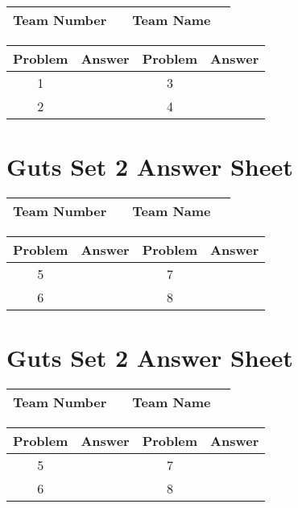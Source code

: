 \documentclass[14pt]{article}
\begin{document}
\begin{center}
\begin{tabular}{|r|r|r|r|}
\hline
	Team Number & \hspace{10em} &
	Team Name & \hspace{15em} \\ \hline
\end{tabular}
\end{center}
\begin{tabularx}{\textwidth}{|c|l|c|X|}\hline
	Problem & Answer & Problem & Answer \\\hline
	1 & \hspace{15em} & 3 & \\\hline
	2 & & 4 & \\\hline
\end{tabularx}

\section*{Guts Set 2 Answer Sheet}

\begin{center}
\begin{tabular}{|r|r|r|r|}
\hline
	Team Number & \hspace{10em} &
	Team Name & \hspace{15em} \\ \hline
\end{tabular}
\end{center}
\begin{tabularx}{\textwidth}{|c|l|c|X|}\hline
	Problem & Answer & Problem & Answer \\\hline
	5 & \hspace{15em} & 7 & \\\hline
	6 & & 8 & \\\hline
\end{tabularx}

\vspace{30px}

\section*{Guts Set 2 Answer Sheet}

\begin{center}
\begin{tabular}{|r|r|r|r|}
\hline
	Team Number & \hspace{10em} &
	Team Name & \hspace{15em} \\ \hline
\end{tabular}
\end{center}
\begin{tabularx}{\textwidth}{|c|l|c|X|}\hline
	Problem & Answer & Problem & Answer \\\hline
	5 & \hspace{15em} & 7 & \\\hline
	6 & & 8 & \\\hline
\end{tabularx}
\end{document}
